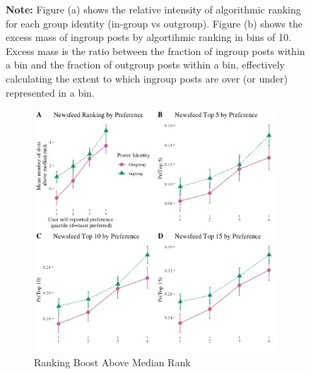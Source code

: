\documentclass[12pt,letterpaper]{article}
\begin{document}
\begin{figure}[ht]
\footnotesize \textbf{Note:} Figure (a) shows the relative intensity of algorithmic ranking for each group identity (in-group vs outgroup). Figure (b) shows the excess mass of ingroup posts by algortihmic ranking in bins of 10. Excess mass is the ratio between the fraction of ingroup posts within a bin and the fraction of outgroup posts within a bin, effectively calculating the extent to which ingroup posts are over (or under) represented in a bin.
\end{figure}

\begin{figure}[ht]
\caption{Relationship between Newsfeed Algorithmic Ranking and in-group Status conditional on Subject Explicit Preference}
\label{fig:nf_main}
    \begin{subfigure}{.5\textwidth} 
        \centering
        \includegraphics[width=1\linewidth]{Output/Graphs/Audit/Ranking line graphs/US NF all outcomes panel by norm preference by ingroup.jpg} 
        \caption{Ranking Boost Above Median Rank}
        \label{fig:nf_line}
        \end{subfigure}
    \begin{subfigure}{.5\textwidth}
        \centering

\end{subfigure}
\end{figure}
\end{document}
